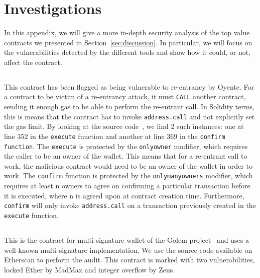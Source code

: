 \section{Investigations}
\label{sec:investigations}
In this appendix, we will give a more in-depth security analysis of the top value contracts we presented in Section~\ref{sec:discussion}. In particular, we will focus on the vulnerabilities detected by the different tools and show how it could, or not, affect the contract.

\subsection*{}
  This contract has been flagged as being vulnerable to re-entrancy by Oyente. For a contract to be victim of a re-entrancy attack, it must \lstinline{CALL} another contract, sending it enough gas to be able to perform the re-entrant call. In Solidity terms, this is means that the contract has to invoke \lstinline{address.call} and not explicitly set the gas limit. By looking at the source code~\cite{ether-foundation-contract-code}, we find 2 such instances: one at line 352 in the \lstinline{execute} function and another at line 369 in the \lstinline{confirm function}. The \lstinline{execute} is protected by the \lstinline{onlyowner} modifier, which requires the caller to be an owner of the wallet. This means that for a re-entrant call to work, the malicious contract would need to be an owner of the wallet in order to work. The \lstinline{confirm} function is protected by the \lstinline{onlymanyowners} modifier, which requires at least n owners to agree on confirming a particular transaction before it is executed, where n is agreed upon at contract creation time. Furthermore, \lstinline{confirm} will only invoke \lstinline{address.call} on a transaction previously created in the \lstinline{execute} function.

\subsection*{}
This is the contract for multi-signature wallet of the Golem project~\cite{golem-project} and uses a well-known multi-signature implementation. We use the source code available on Etherscan to perform the audit.
This contract is marked with two vulnerabilities, locked Ether by MadMax and integer overflow by Zeus.

